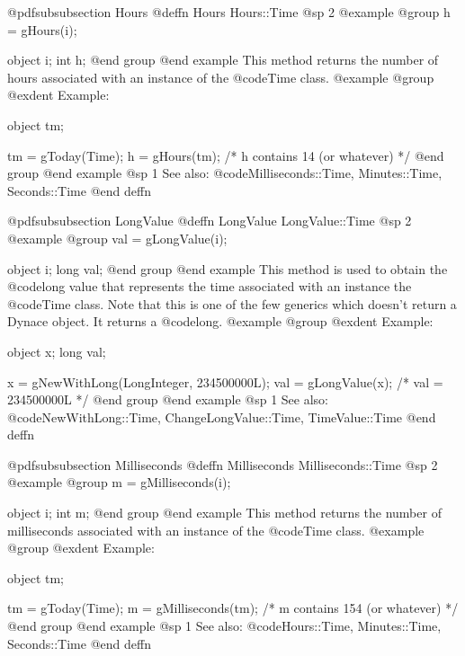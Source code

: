 @pdfsubsubsection {Hours}
@deffn {Hours} Hours::Time
@sp 2
@example
@group
h = gHours(i);

object  i;
int     h;
@end group
@end example
This method returns the number of hours associated with an
instance of the @code{Time} class.
@example
@group
@exdent Example:

object  tm;

tm = gToday(Time);
h = gHours(tm);   /*  h contains 14 (or whatever)  */
@end group
@end example
@sp 1
See also:  @code{Milliseconds::Time, Minutes::Time, Seconds::Time}
@end deffn
















@pdfsubsubsection {LongValue}
@deffn {LongValue} LongValue::Time
@sp 2
@example
@group
val = gLongValue(i);

object  i;
long    val;
@end group
@end example
This method is used to obtain the @code{long} value that represents
the time associated with an instance the @code{Time} class.  Note that
this is one of the few generics which doesn't return a Dynace object.
It returns a @code{long}.
@example
@group
@exdent Example:

object  x;
long    val;

x = gNewWithLong(LongInteger, 234500000L);
val = gLongValue(x);    /*  val = 234500000L  */
@end group
@end example
@sp 1
See also:  @code{NewWithLong::Time, ChangeLongValue::Time, TimeValue::Time}
@end deffn










@pdfsubsubsection {Milliseconds}
@deffn {Milliseconds} Milliseconds::Time
@sp 2
@example
@group
m = gMilliseconds(i);

object  i;
int     m;
@end group
@end example
This method returns the number of milliseconds associated with an
instance of the @code{Time} class.
@example
@group
@exdent Example:

object  tm;

tm = gToday(Time);
m = gMilliseconds(tm);   /*  m contains 154 (or whatever)  */
@end group
@end example
@sp 1
See also:  @code{Hours::Time, Minutes::Time, Seconds::Time}
@end deffn
















